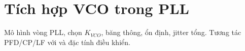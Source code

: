 \chapter{Tích hợp VCO trong PLL}
Mô hình vòng PLL, chọn \(K_{VCO}\), băng thông, ổn định, jitter tổng. Tương tác PFD/CP/LF với \VCO{} và đặc tính điều khiển.


